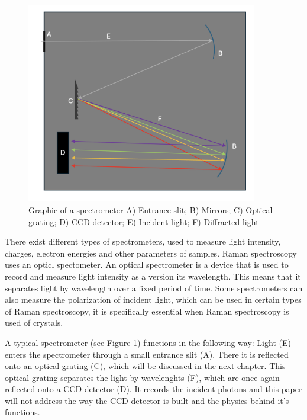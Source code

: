 \begin{figure}[ht]
    \centering
    \includegraphics[width=0.9\textwidth]{images/setup_graphics/spectrometer.png}
    \caption{Graphic of a spectrometer A) Entrance slit; B) Mirrors; C) Optical grating; D) CCD detector; E) Incident light; F) Diffracted light}
    \label{fig:spectrometer}
\end{figure}

There exist different types of spectrometers, used to measure light intensity, charges, electron energies and other parameters of samples. Raman spectroscopy uses an opticl spectometer. An optical spectrometer is a device that is used to record and measure light intensity as a version its wavelength. This means that it separates light by wavelength over a fixed period of time. Some spectrometers can also measure the polarization of incident light, which can be used in certain types of Raman spectroscopy, it is specifically essential when Raman spectroscopy is used of crystals. \cite{RSAA} \cite{wikioptspec}

\bigskip

A typical spectrometer (see Figure \ref{fig:spectrometer}) functions in the following way: Light (E) enters the spectrometer through a small entrance slit (A). There it is reflected onto an optical grating (C), which will be discussed in the next chapter. This optical grating separates the light by wavelenghts (F), which are once again reflected onto a CCD detector (D). It records the incident photons and this paper will not address the way the CCD detector is built and the physics behind it's functions.\cite{wikigrating}

